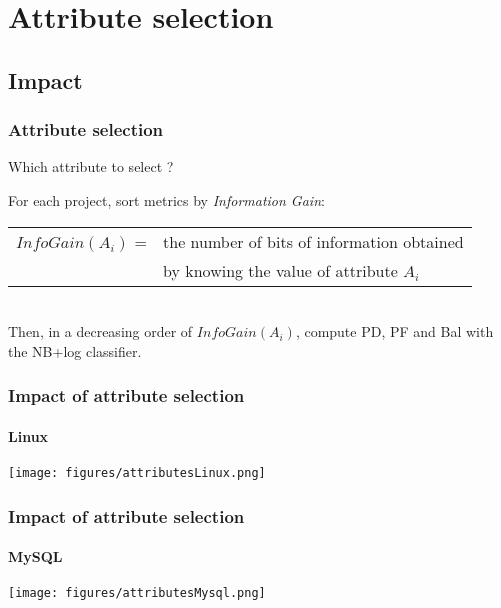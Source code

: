 \section{Attribute selection}
\subsection{Impact}

\begin{frame}
 \frametitle{Attribute selection}
 \begin{center}
  \alert{Which attribute to select ?}
 \end{center}
 For each project, sort metrics by \emph{Information Gain}:\\
 \vspace{0.2cm}
 \begin{tabular}{ll}
  $InfoGain(A_i)$ = & the number of bits of information obtained\\
   & by knowing the value of attribute $A_i$
 \end{tabular}
 \\
 \vspace{0.4cm}
 Then, in a decreasing order of $InfoGain(A_i)$, compute PD, PF and Bal with the NB+log classifier.
\end{frame}

\begin{frame}
 \frametitle{Impact of attribute selection}
 \framesubtitle{Linux}
 \begin{center}
  \texttt{[image: figures/attributesLinux.png]}
 \end{center}
\end{frame}

\begin{frame}
 \frametitle{Impact of attribute selection}
 \framesubtitle{MySQL}
 \begin{center}
  \texttt{[image: figures/attributesMysql.png]}
 \end{center}
\end{frame}

